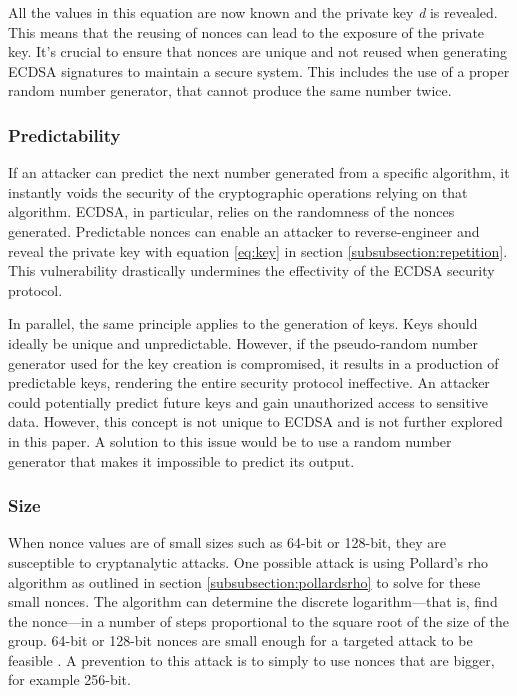 All the values in this equation are now known and the private key \textit{d} is revealed. This means that the reusing of nonces can lead to the exposure of the private key. It's crucial to ensure that nonces are unique and not reused when generating ECDSA signatures to maintain a secure system. This includes the use of a proper random number generator, that cannot produce the same number twice.

\subsubsection{Predictability}
If an attacker can predict the next number generated from a specific algorithm, it instantly voids the security of the cryptographic operations relying on that algorithm. ECDSA, in particular, relies on the randomness of the nonces generated. Predictable nonces can enable an attacker to reverse-engineer and reveal the private key with equation \ref{eq:key} in section \ref{subsubsection:repetition}. This vulnerability drastically undermines the effectivity of the ECDSA security protocol.

In parallel, the same principle applies to the generation of keys. Keys should ideally be unique and unpredictable. However, if the pseudo-random number generator used for the key creation is compromised, it results in a production of predictable keys, rendering the entire security protocol ineffective. An attacker could potentially predict future keys and gain unauthorized access to sensitive data. However, this concept is not unique to ECDSA and is not further explored in this paper. A solution to this issue would be to use a random number generator that makes it impossible to predict its output.

\subsubsection{Size}
When nonce values are of small sizes such as 64-bit or 128-bit, they are susceptible to cryptanalytic attacks. One possible attack is using Pollard's rho algorithm as outlined in section \ref{subsubsection:pollardsrho} to solve for these small nonces. The algorithm can determine the discrete logarithm—that is, find the nonce—in a number of steps proportional to the square root of the size of the group. 64-bit or 128-bit nonces are small enough for a targeted attack to be feasible \cite{cryptoeprint:2019/023}. A prevention to this attack is to simply to use nonces that are bigger, for example 256-bit.

